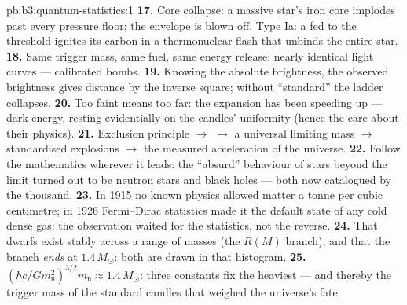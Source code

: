 \begin{solution}{pb:b3:quantum-statistics:1}
\textbf{17.} Core collapse: a massive star's iron core implodes
past every pressure floor; the envelope is blown off. Type Ia: a
 fed to the threshold ignites its carbon in a
thermonuclear flash that unbinds the entire star.
\textbf{18.} Same trigger mass, same fuel, same energy release:
nearly identical light curves --- calibrated bombs.
\textbf{19.} Knowing the absolute brightness, the observed
brightness gives distance by the inverse square; without
``standard'' the ladder collapses.
\textbf{20.} Too faint means too far: the expansion has been
speeding up --- dark energy, resting evidentially on the candles'
uniformity (hence the care about their physics).
\textbf{21.} Exclusion principle $\to$  $\to$ a
universal limiting mass $\to$ standardised explosions $\to$ the
measured acceleration of the universe.
\textbf{22.} Follow the mathematics wherever it leads: the
``absurd'' behaviour of stars beyond the limit turned out to be
neutron stars and black holes --- both now catalogued by the
thousand.
\textbf{23.} In 1915 no known physics allowed matter a tonne per
cubic centimetre; in 1926 Fermi--Dirac statistics made it the
default state of any cold dense gas: the observation waited for
the statistics, not the reverse.
\textbf{24.} That dwarfs exist stably across a range of masses
(the $R(M)$ branch), and that the branch \emph{ends} at
$1.4\,M_\odot$: both are drawn in that histogram.
\textbf{25.} $(\hbar c/Gm_{\text{n}}^2)^{3/2}m_{\text{n}} \approx
1.4\,M_\odot$: three constants fix the heaviest  ---
and thereby the trigger mass of the standard candles that weighed
the universe's fate.
\end{solution}
